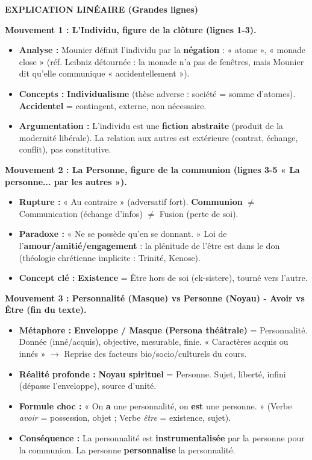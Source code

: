 \documentclass[11pt]{article}
\begin{document}
\begin{exoresolu}
\textbf{EXPLICATION LINÉAIRE (Grandes lignes)}

\textbf{Mouvement 1 : L'Individu, figure de la clôture (lignes 1-3).}
\begin{itemize}
    \item \textbf{Analyse :} Mounier définit l'individu par la \textbf{négation} : « atome », « monade close » (réf. Leibniz détournée : la monade n'a pas de fenêtres, mais Mounier dit qu'elle communique « accidentellement »).
    \item \textbf{Concepts :} \textbf{Individualisme} (thèse adverse : société = somme d'atomes). \textbf{Accidentel} = contingent, externe, non nécessaire.
    \item   \textbf{Argumentation :} L'individu est une \textbf{fiction abstraite} (produit de la modernité libérale). La relation aux autres est extérieure (contrat, échange, conflit), pas constitutive.
\end{itemize}

\textbf{Mouvement 2 : La Personne, figure de la communion (lignes 3-5 « La personne... par les autres »).}
\begin{itemize}
    \item \textbf{Rupture :} « Au contraire » (adversatif fort). \textbf{Communion} $\neq$ Communication (échange d'infos) $\neq$ Fusion (perte de soi).
    \item \textbf{Paradoxe :} « Ne se possède qu'en se donnant. » Loi de l'\textbf{amour/amitié/engagement} : la plénitude de l'être est dans le don (théologie chrétienne implicite : Trinité, Kenose).
    \item \textbf{Concept clé :} \textbf{Existence} = Être hors de soi (ek-sistere), tourné vers l'autre.
\end{itemize}

\textbf{Mouvement 3 : Personnalité (Masque) vs Personne (Noyau) - Avoir vs Être (fin du texte).}
\begin{itemize}
    \item \textbf{Métaphore :} \textbf{Enveloppe / Masque (Persona théâtrale)} = Personnalité. Donnée (inné/acquis), objective, mesurable, finie. « Caractères acquis ou innés » $\to$ Reprise des facteurs bio/socio/culturels du cours.
    \item \textbf{Réalité profonde :} \textbf{Noyau spirituel} = Personne. Sujet, liberté, infini (dépasse l'enveloppe), source d'unité.
    \item \textbf{Formule choc :} « On \textbf{a} une personnalité, on \textbf{est} une personne. » (Verbe \emph{avoir} = possession, objet ; Verbe \emph{être} = existence, sujet).
    \item \textbf{Conséquence :} La personnalité est \textbf{instrumentalisée} par la personne pour la communion. La personne \textbf{personnalise} la personnalité.
\end{itemize}


\end{exoresolu}
\end{document}
